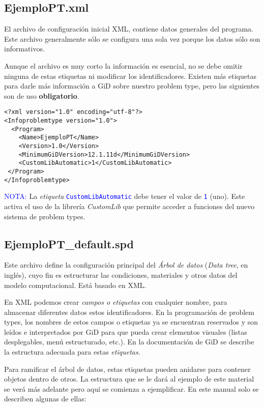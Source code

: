\documentclass[10pt, a4paper, twocolumn]{article}
\begin{document}
\subsection{EjemploPT.xml}\label{sec:codigoXML}

El archivo de configuración inicial XML, contiene datos generales del programa. Este archivo generalmente sólo se configura una sola vez porque los datos sólo son informativos.

Aunque el archivo es muy corto la información es esencial, no se debe omitir ninguna de estas etiquetas ni modificar los identificadores. Existen más etiquetas para darle más información a GiD sobre nuestro problem type, pero las siguientes son de uso \textbf{obligatorio}.

\lstset{language=XML} 
\begin{lstlisting}
<?xml version="1.0" encoding="utf-8"?>
<Infoproblemtype version="1.0">
  <Program>
    <Name>EjemploPT</Name>
    <Version>1.0</Version>   
    <MinimumGiDVersion>12.1.11d</MinimumGiDVersion>
    <CustomLibAutomatic>1</CustomLibAutomatic>
 </Program>
</Infoproblemtype>
\end{lstlisting}

\textcolor{blue}{NOTA:} La \textit{etiqueta} \texttt{\textcolor{blue}{CustomLibAutomatic}} debe tener el valor de \texttt{\textcolor{blue}{1}} (uno). Este activa el uso de la librería \textit{CustomLib} que permite acceder a funciones del nuevo sistema de problem types.
\newpage
\subsection{EjemploPT\_default.spd}

Este archivo define la configuración principal del \textit{Árbol de datos} (\textit{Data tree}, en inglés), cuyo fin es estructurar las condiciones, materiales y otros datos del modelo computacional. Está basado en XML.

En XML podemos crear \textit{campos o etiquetas} con cualquier nombre, para almacenar diferentes datos estos identificadores. En la programación de problem types, los nombres de estos campos o etiquetas ya se encuentran reservados y son leídos e interpretados por GiD para que pueda crear elementos visuales (listas desplegables, menú estructurado, etc.). En la documentación de GiD se describe la estructura adecuada para estas \textit{etiquetas}.

Para ramificar el árbol de datos, estas etiquetas pueden anidarse para contener objetos dentro de otros. La estructura que se le dará al ejemplo de este material se verá más adelante pero aquí se comienza a ejemplificar. En este manual solo se describen algunas de ellas:
\end{document}
